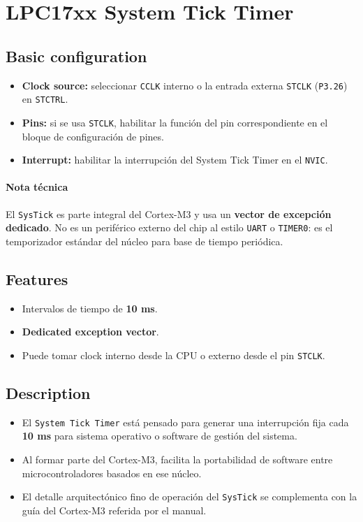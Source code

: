 \setcounter{section}{22}
\section{LPC17xx System Tick Timer}

\subsection{Basic configuration}
\begin{itemize}
  \item \textbf{Clock source:} seleccionar \texttt{CCLK} interno o la entrada externa \texttt{STCLK} (\texttt{P3.26}) en \texttt{STCTRL}.
  \item \textbf{Pins:} si se usa \texttt{STCLK}, habilitar la funci\'on del pin correspondiente en el bloque de configuraci\'on de pines.
  \item \textbf{Interrupt:} habilitar la interrupci\'on del System Tick Timer en el \texttt{NVIC}.
\end{itemize}

\paragraph{Nota t\'ecnica}
El \texttt{SysTick} es parte integral del Cortex-M3 y usa un \textbf{vector de excepci\'on dedicado}. No es un perif\'erico externo del chip al estilo \texttt{UART} o \texttt{TIMER0}: es el temporizador est\'andar del n\'ucleo para base de tiempo peri\'odica.

\subsection{Features}
\begin{itemize}
  \item Intervalos de tiempo de \textbf{10 ms}.
  \item \textbf{Dedicated exception vector}.
  \item Puede tomar clock interno desde la CPU o externo desde el pin \texttt{STCLK}.
\end{itemize}

\subsection{Description}
\begin{itemize}
  \item El \texttt{System Tick Timer} est\'a pensado para generar una interrupci\'on fija cada \textbf{10 ms} para sistema operativo o software de gesti\'on del sistema.
  \item Al formar parte del Cortex-M3, facilita la portabilidad de software entre microcontroladores basados en ese n\'ucleo.
  \item El detalle arquitect\'onico fino de operaci\'on del \texttt{SysTick} se complementa con la gu\'ia del Cortex-M3 referida por el manual.
\end{itemize}

